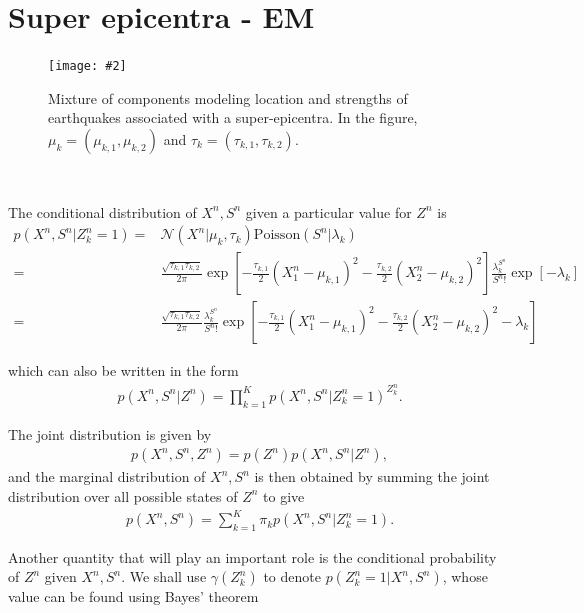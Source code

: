 \documentclass[11pt]{extarticle}
\newcommand{\N}{\mathcal{N}}
\newcommand{\0}{\mathbf{0}}
\renewcommand{\(}{\left(}
\renewcommand{\)}{\right)}
\theoremstyle{definition}
\newcommand{\image}[3]{
	\begin{figure}[!ht]
		\centering
	    \texttt{[image: \#2]}
		\caption{#3}
		\label{fig:#2}
	\end{figure}
}
\begin{document}
\section{Super epicentra - EM}
\image{0.5}{Q2_2}{Mixture of components modeling location and strengths of earthquakes associated with a super-epicentra. In the figure, $\mu_{k} = (\mu_{k,1}, \mu_{k,2})$ and $\tau_{k} = (\tau_{k,1}, \tau_{k,2})$.}
\noindent{} \\
\par The conditional distribution of $X^{n}, S^{n}$ given a particular value for $Z^{n}$ is
\begin{align*}
	p(X^{n}, S^{n} \vert Z^{n}_{k}=1) =& \N(X^{n} \vert \mu_{k}, \tau_{k}) \mathrm{Poisson}(S^{n} \vert \lambda_{k}) \\ 
	=& \frac{\sqrt{\tau_{k,1}\tau_{k,2}}}{2\pi} \exp\left[-\frac{\tau_{k,1}}{2}(X^{n}_{1} - \mu_{k,1})^{2} - \frac{\tau_{k,2}}{2}(X^{n}_{2} - \mu_{k,2})^{2}\right] \frac{\lambda_{k}^{S^{n}}}{S^{n}!} \exp\left[-\lambda_{k}\right] \\
	=& \frac{\sqrt{\tau_{k,1}\tau_{k,2}}}{2\pi} \frac{\lambda_{k}^{S^{n}}}{S^{n}!} \exp\left[-\frac{\tau_{k,1}}{2}(X^{n}_{1} - \mu_{k,1})^{2} - \frac{\tau_{k,2}}{2}(X^{n}_{2} - \mu_{k,2})^{2} -\lambda_{k}\right]
\end{align*}
\par which can also be written in the form
\begin{align*}
	p(X^{n}, S^{n} \vert Z^{n}) = \prod_{k=1}^{K} p(X^{n}, S^{n} \vert Z^{n}_{k}=1)^{Z^{n}_{k}}.
\end{align*}
\par The joint distribution is given by
\begin{align*}
	p(X^{n}, S^{n}, Z^{n}) = p(Z^{n}) p(X^{n}, S^{n} \vert Z^{n}),
\end{align*}
and the marginal distribution of $X^{n}, S^{n}$ is then obtained by summing the joint distribution over all possible states of $Z^{n}$ to give
\begin{align*}
	p(X^{n}, S^{n}) = \sum_{k=1}^{K} \pi_{k} p(X^{n}, S^{n} \vert Z^{n}_{k}=1).
\end{align*}
\par Another quantity that will play an important role is the conditional probability of $Z^{n}$ given $X^{n}, S^{n}$. We shall use $\gamma(Z^{n}_{k})$ to denote $p(Z^{n}_{k} = 1 \vert X^{n}, S^{n})$, whose value can be found using Bayes' theorem
\end{document}
